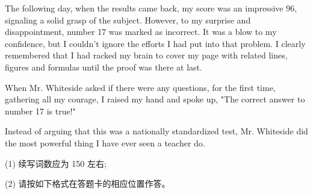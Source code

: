 \documentclass{英语试卷}
\begin{document}
\par The following day, when the results came back, my score was an impressive 96, signaling a solid grasp of the subject. However, to my surprise and disappointment, number 17 was marked as incorrect. It was a blow to my confidence, but I couldn't ignore the efforts I had put into that problem. I clearly remembered that I had racked my brain to cover my page with related lines, figures and formulas until the proof was there at last.\par
\par When Mr. Whiteside asked if there were any questions, for the first time, gathering all my courage, I raised my hand and spoke up, "The correct answer to number 17 is true!"\par
\par Instead of arguing that this was a nationally standardized test, Mr. Whiteside did the most powerful thing I have ever seen a teacher do.\par
\par (1) 续写词数应为 150 左右;\par
\par (2) 请按如下格式在答题卡的相应位置作答。\par
{}
\end{document}
